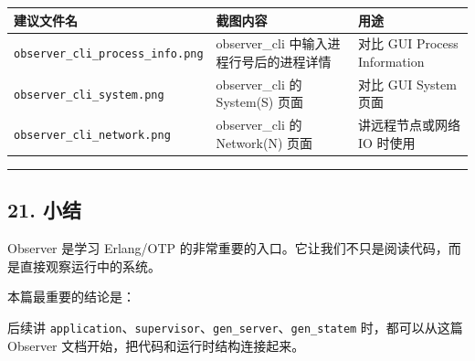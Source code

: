 \begin{longtable}[]{@{}
  >{\raggedright\arraybackslash}p{}
  >{\raggedright\arraybackslash}p{}
  >{\raggedright\arraybackslash}p{}@{}}
\toprule\noalign{}
\begin{minipage}[b]{\linewidth}\raggedright
建议文件名
\end{minipage} & \begin{minipage}[b]{\linewidth}\raggedright
截图内容
\end{minipage} & \begin{minipage}[b]{\linewidth}\raggedright
用途
\end{minipage} \\
\midrule\noalign{}
\endhead
\bottomrule\noalign{}
\endlastfoot
\texttt{observer\_cli\_process\_info.png} & observer\_cli
中输入进程行号后的进程详情 & 对比 GUI Process Information \\
\texttt{observer\_cli\_system.png} & observer\_cli 的 System(S) 页面 &
对比 GUI System 页面 \\
\texttt{observer\_cli\_network.png} & observer\_cli 的 Network(N) 页面 &
讲远程节点或网络 IO 时使用 \\
\end{longtable}

\begin{center}\rule{0.5\linewidth}{0.5pt}\end{center}

\subsection{21. 小结}\label{ux5c0fux7ed3}

Observer 是学习 Erlang/OTP
的非常重要的入口。它让我们不只是阅读代码，而是直接观察运行中的系统。

本篇最重要的结论是：

\begin{Shaded}
\begin{Highlighting}[]
\end{Highlighting}
\end{Shaded}

后续讲
\texttt{application}、\texttt{supervisor}、\texttt{gen\_server}、\texttt{gen\_statem}
时，都可以从这篇 Observer 文档开始，把代码和运行时结构连接起来。
